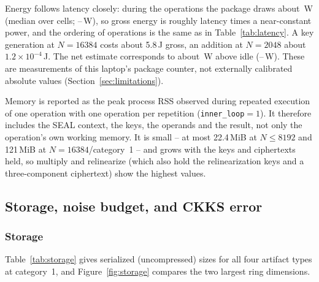 \begin{table}[h!]
\centering\small

\caption{Energy per operation and peak memory, Standard scenario, range over every measured parameter combination ($N \le 8192$ plus $N{=}16384$/category~1). Energy: mean of 30 repetitions per cell. Memory: peak process RSS, mean of three separate runs per cell with one operation per repetition.}
\label{tab:energy-memory}
\end{table}

Energy follows latency closely: during the operations the package draws about \grossPowerMed\,W (median over cells; \grossPowerLo--\grossPowerHi\,W), so gross energy is roughly latency times a near-constant power, and the ordering of operations is the same as in Table~\ref{tab:latency}. A key generation at $N{=}16384$ costs about 5.8\,J gross, an addition at $N{=}2048$ about $1.2{\times}10^{-4}$\,J. The net estimate corresponds to about \netPowerMed\,W above idle (\netPowerLo--\netPowerHi\,W). These are measurements of this laptop's package counter, not externally calibrated absolute values (Section~\ref{sec:limitations}).

Memory is reported as the peak process RSS observed during repeated execution of one operation with one operation per repetition (\texttt{inner\_loop}${=}1$). It therefore includes the SEAL context, the keys, the operands and the result, not only the operation's own working memory. It is small -- at most 22.4\,MiB at $N \le 8192$ and 121\,MiB at $N{=}16384$/category~1 -- and grows with the keys and ciphertexts held, so multiply and relinearize (which also hold the relinearization keys and a three-component ciphertext) show the highest values.

\clearpage
\subsection{Storage, noise budget, and CKKS error}

\subsubsection*{Storage}

Table~\ref{tab:storage} gives serialized (uncompressed) sizes for all four artifact types at category~1, and Figure~\ref{fig:storage} compares the two largest ring dimensions.

\begin{table}[h!]
\centering\small

\caption{Serialized artifact sizes, category~1 (128-bit), from \texttt{seal\_sizes.csv}. BFV, BGV and CKKS sizes are identical at these parameters. $N{=}2048$ has no relinearization keys (depth 0).}
\label{tab:storage}
\end{table}

